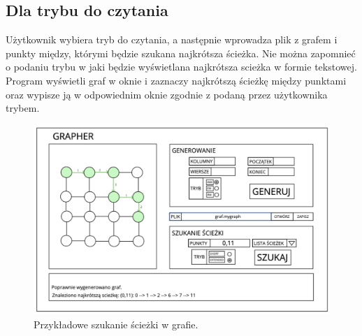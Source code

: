 \documentclass[10pt, a4paper]{report}
\begin{document}
    \subsection{Dla trybu do czytania}
    Użytkownik wybiera tryb do czytania, a następnie wprowadza plik z grafem i punkty między, którymi będzie szukana najkrótsza ścieżka. Nie można zapomnieć o podaniu trybu w jaki będzie wyświetlana najkrótsza scieżka w formie tekstowej.
    Program wyświetli graf w oknie i zaznaczy najkrótszą ścieżkę między punktami oraz wypisze ją w odpowiednim oknie zgodnie z podaną przez użytkownika trybem.
    \begin{figure}[ht]
      \begin{center}
          \includegraphics[scale=0.22]{example_pathfinding.jpg}
          \caption{Przykładowe szukanie ścieżki w grafie.}
      \end{center}
    \end{figure}
    \newpage
\end{document}

